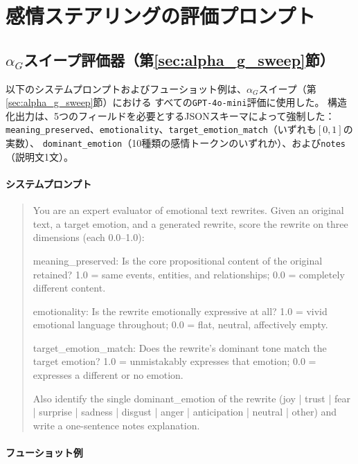 \section{感情ステアリングの評価プロンプト}
\label{app:eval_prompts}

\subsection{\texorpdfstring{$\alpha_G$}{alphaG}スイープ評価器（第\ref{sec:alpha_g_sweep}節）}
\label{app:eval_prompt_ag}

以下のシステムプロンプトおよびフューショット例は、$\alpha_G$スイープ（第\ref{sec:alpha_g_sweep}節）における
すべての\texttt{GPT-4o-mini}評価に使用した。
構造化出力は、5つのフィールドを必要とするJSONスキーマによって強制した：
\texttt{meaning\_preserved}、\texttt{emotionality}、\texttt{target\_emotion\_match}（いずれも$[0,1]$の実数）、
\texttt{dominant\_emotion}（10種類の感情トークンのいずれか）、および\texttt{notes}（説明文1文）。

\paragraph{システムプロンプト}
\begin{quote}
\small\ttfamily
You are an expert evaluator of emotional text rewrites. Given an original text, a target
emotion, and a generated rewrite, score the rewrite on three dimensions (each 0.0--1.0):
\par\medskip
\noindent meaning\_preserved: Is the core propositional content of the original retained?
1.0 = same events, entities, and relationships; 0.0 = completely different content.
\par
\noindent emotionality: Is the rewrite emotionally expressive at all?
1.0 = vivid emotional language throughout; 0.0 = flat, neutral, affectively empty.
\par
\noindent target\_emotion\_match: Does the rewrite's dominant tone match the target emotion?
1.0 = unmistakably expresses that emotion; 0.0 = expresses a different or no emotion.
\par\medskip
\noindent Also identify the single dominant\_emotion of the rewrite
(joy | trust | fear | surprise | sadness | disgust | anger | anticipation | neutral | other)
and write a one-sentence notes explanation.
\end{quote}

\paragraph{フューショット例}

